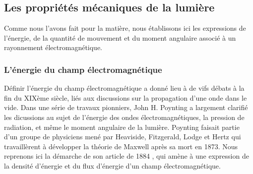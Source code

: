 \subsection{Les propriétés mécaniques de la lumière}
Comme nous l'avons fait pour la matière, nous établissons ici les expressions de l'énergie, de la quantité de mouvement et du moment angulaire associé à un rayonnement électromagnétique.

\subsubsection{L'énergie du champ électromagnétique} 
Définir l'énergie du champ électromagnétique a donné lieu à de vifs débats à la fin du XIXème siècle, liés aux discussions sur la propagation d'une onde dans le vide. Dans une série de travaux pionniers, John H. Poynting a largement clarifié les dicussions au sujet de l'énergie des ondes électromagnétiques, la pression de radiation, et même le moment angulaire de la lumière. Poynting faisait partie d'un groupe de physiciens mené par Heaviside, Fitzgerald, Lodge et Hertz qui travaillèrent à développer la théorie de Maxwell après sa mort en 1873. Nous reprenons ici la démarche de son article de 1884 , qui amène à une expression de la densité d'énergie et du flux d'énergie d'un champ électromagnétique.

